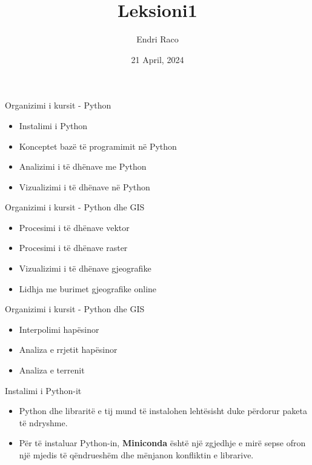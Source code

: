\documentclass[
  ignorenonframetext,
]{beamer}
\title{Leksioni1}
\author{Endri Raco}
\date{21 April, 2024}
\begin{document}
\frame{\titlepage}

\begin{frame}[allowframebreaks]
  \tableofcontents[hideallsubsections]
\end{frame}
\begin{frame}{Organizimi i kursit - Python}
\protect\hypertarget{organizimi-i-kursit---python}{}
\begin{itemize}
\item
  Instalimi i Python
\item
  Konceptet bazë të programimit në Python
\item
  Analizimi i të dhënave me Python
\item
  Vizualizimi i të dhënave në Python
\end{itemize}
\end{frame}

\begin{frame}{Organizimi i kursit - Python dhe GIS}
\protect\hypertarget{organizimi-i-kursit---python-dhe-gis}{}
\begin{itemize}
\item
  Procesimi i të dhënave vektor
\item
  Procesimi i të dhënave raster
\item
  Vizualizimi i të dhënave gjeografike
\item
  Lidhja me burimet gjeografike online
\end{itemize}
\end{frame}

\begin{frame}{Organizimi i kursit - Python dhe GIS}
\protect\hypertarget{organizimi-i-kursit---python-dhe-gis-1}{}
\begin{itemize}
\item
  Interpolimi hapësinor
\item
  Analiza e rrjetit hapësinor
\item
  Analiza e terrenit
\end{itemize}
\end{frame}

\begin{frame}{Instalimi i Python-it}
\protect\hypertarget{instalimi-i-python-it}{}
\begin{itemize}
\item
  Python dhe libraritë e tij mund të instalohen lehtësisht duke përdorur
  paketa të ndryshme.
\item
  Për të instaluar Python-in, \textbf{Miniconda} është një zgjedhje e
  mirë sepse ofron një mjedis të qëndrueshëm dhe mënjanon konfliktin e
  librarive.
\end{itemize}
\end{frame}
\end{document}
